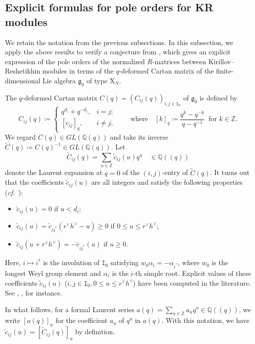 \documentclass[12pt]{amsart}
\theoremstyle{definition}
\theoremstyle{remark}
\numberwithin{equation}{section}
\newcommand{\confer}{\textit{cf.}\ }
\begin{document}
 \subsection{Explicit formulas for pole orders for KR modules}\label{subsec:PKR}
 We retain the notation from the previous subsections.
In this subsection, we apply the above results to verify a conjecture from \cite{FM}, which gives an explicit expression of the pole orders of the normalized $R$-matrices between Kirillov--Reshetikhin modules in terms of the $q$-deformed Cartan matrix of the finite-dimensional Lie algebra $\mathfrak{g}_0$ of type $\mathrm{X}_N$. 

  The $q$-deformed Cartan matrix  $C(q) = (C_{ij}(q))_{i,j \in \mathtt{I}_0}$ of $\mathfrak{g}_0$ is defined by
\[ C_{ij}(q) \coloneqq \begin{cases}
  q^{d_i}+q^{-d_i}, &i=j;\\
  [c_{ij}]_q,&i\neq j,
\end{cases}  \quad \quad\text{where}\quad [k]_q\coloneqq\frac{q^k-q^{-k}}{q-q^{-1}}\;\;\text{for } k\in\mathbb Z.\]
We regard $C(q) \in GL(\mathbb{Q}(q))$ and take its inverse $\widetilde{C}(q) \coloneqq C(q)^{-1} \in GL(\mathbb{Q}(q))$.
Let 
\[ \widetilde{C}_{ij}(q) = \sum_{u \in \mathbb{Z}} \widetilde{c}_{ij}(u) q^u \quad \in \mathbb{Q}(\!(q)\!) \]
denote the Laurent expansion at $q=0$ of the $(i,j)$-entry of $\widetilde{C}(q)$.
It turns out that the coefficients $\widetilde{c}_{ij}(u)$ are all integers and satisfy the following properties (\confer \cite[\S4]{Fujita-Oh-2021}):
\begin{itemize}
\item $\widetilde{c}_{ij}(u) = 0$ if $u < d_i$;
\item $\widetilde{c}_{ij}(u) = \widetilde{c}_{ij^*}(r^\vee h^\vee - u)\ge 0$ if $0 \le u \le r^\vee h^\vee$;
\item $\widetilde{c}_{ij}(u+r^\vee h^\vee) = -\widetilde{c}_{ij^*}(u)$ if $ u \ge 0$.
\end{itemize} 
Here, $i \mapsto i^*$ is the involution of $\mathtt{I}_0$ satisfying $w_0 \alpha_i = -\alpha_{i^*}$, where $w_0$ is the longest Weyl group element and $\alpha_i$ is the $i$-th simple root.
Explicit values of these coefficients $\widetilde{c}_{ij}(u)$ ($i,j \in \mathtt{I}_0, 0 \le u \le r^\vee h^\vee$) have been computed in the literature. See \cite[Appendix A]{GTL}, \cite[Appendix C]{FR-W}, \cite[\S4.3]{Fujita-Oh-2021} for instance.

In what follows, for a formal Laurent series $a(q) = \sum_{u \in \mathbb{Z}} a_u q^u\in\mathbb Q(\!(q)\!)$, we write $[a(q)]_u$ for the coefficient $a_u$ of $q^u$ in $a(q)$.
With this notation, we have $\widetilde{c}_{ij}(u) = [\widetilde{C}_{ij}(q)]_u$ by definition.
\end{document}
